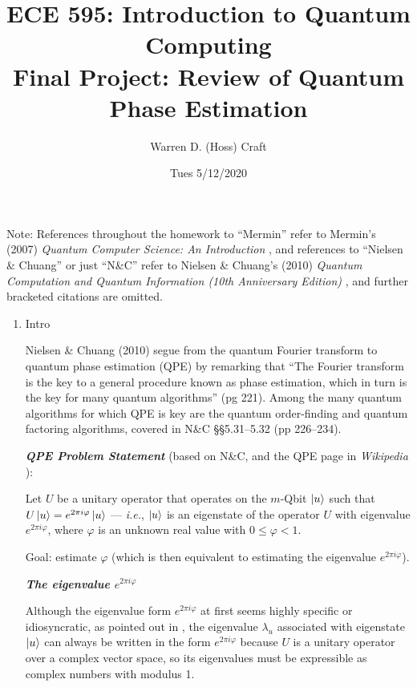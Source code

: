 \documentclass{article}
\title{ECE 595: Introduction to Quantum Computing\\
Final Project: Review of Quantum Phase Estimation}
\author{Warren D. (Hoss) Craft}
\date{Tues 5/12/2020}
\begin{document}
\maketitle

\flushleft

Note: References throughout the homework to ``Mermin'' refer to Mermin's (2007) \textit{Quantum Computer Science: An Introduction} \cite{Mermin_2007}, and references to ``Nielsen \& Chuang'' or just ``N\&C'' refer to Nielsen \& Chuang's (2010) \textit{Quantum Computation and Quantum Information (10th Anniversary Edition)} \cite{Nielsen_&_Chuang_2010}, and further bracketed citations are omitted.

\begin{enumerate}[label=\textbf{(\arabic*)}]

\item Intro

Nielsen \& Chuang (2010) segue from the quantum Fourier transform to quantum phase estimation (QPE) by remarking that ``The Fourier transform is the key to a general procedure known as phase estimation, which in turn is the key for many quantum algorithms'' (pg 221). Among the many quantum algorithms for which QPE is key are the quantum order-finding and quantum factoring algorithms, covered in N\&C \S\S 5.31--5.32 (pp 226--234).

\textbf{\textit{QPE Problem Statement}} (based on N\&C, and the QPE page in \textit{Wikipedia} \cite{wikipedia:qpe}):

\begin{adjustwidth}{0.5in}{0.5in}
Let $U$ be a unitary operator that operates on the $m$-Qbit $\ket{u}$ such that $U\ket{u} = e^{2\pi i \varphi}\ket{u}$ --- \textit{i.e.}, $\ket{u}$ is an eigenstate of the operator $U$ with eigenvalue $e^{2\pi i \varphi}$, where $\varphi$ is an unknown real value with $0\le\varphi<1$.

Goal: estimate $\varphi$ (which is then equivalent to estimating the eigenvalue $e^{2\pi i \varphi}$).
\end{adjustwidth}

\textbf{\textit{The eigenvalue $e^{2\pi i \varphi}$}}

Although the eigenvalue form $e^{2\pi i \varphi}$ at first seems highly specific or idiosyncratic, as pointed out in \cite{wikipedia:qpe}, the eigenvalue $\lambda_u$ associated with eigenstate $\ket{u}$ can always be written in the form $e^{2\pi i \varphi}$ because $U$ is a unitary operator over a complex vector space, so its eigenvalues must be expressible as complex numbers with modulus 1.


\end{enumerate}
\end{document}
